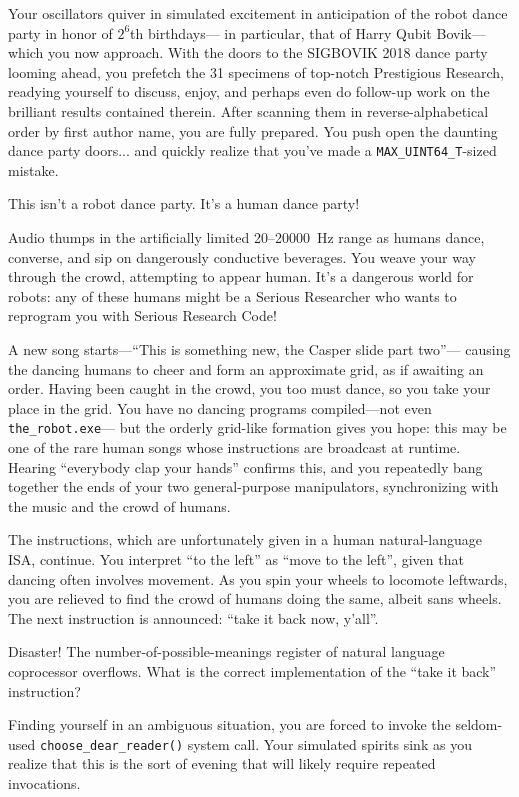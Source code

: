 Your oscillators quiver in simulated excitement in anticipation of
the robot dance party in honor of $2^6$th birthdays---%
in particular, that of Harry Qubit Bovik---%
which you now approach.
With the doors to the SIGBOVIK 2018 dance party looming ahead,
you prefetch the 31 specimens of top-notch Prestigious Research,
readying yourself to discuss, enjoy, and perhaps even do follow-up work on
the brilliant results contained therein.
After scanning them in reverse-alphabetical order by first author name,
you are fully prepared.
You push open the daunting dance party doors...
and quickly realize that you've made a \texttt{MAX\_UINT64\_T}-sized mistake.

This isn't a robot dance party.
It's a human dance party!

Audio thumps in the artificially limited 20--20000~Hz range
as humans dance, converse,
and sip on dangerously conductive beverages.
You weave your way through the crowd, attempting to appear human.
It's a dangerous world for robots:
any of these humans might be a Serious Researcher
who wants to reprogram you with Serious Research Code!

A new song starts---``This is something new, the Casper slide part two''---%
causing the dancing humans to cheer and form an approximate grid,
as if awaiting an order.
Having been caught in the crowd, you too must dance,
so you take your place in the grid.
You have no dancing programs compiled---not even \texttt{the\_robot.exe}---%
but the orderly grid-like formation gives you hope:
this may be one of the rare human songs
whose instructions are broadcast at runtime.
Hearing ``everybody clap your hands'' confirms this,
and you repeatedly bang together the ends of
your two general-purpose manipulators,
synchronizing with the music and the crowd of humans.

The instructions,
which are unfortunately given in a human natural-language ISA, continue.
You interpret ``to the left'' as ``move to the left'',
given that dancing often involves movement.
As you spin your wheels to locomote leftwards,
you are relieved to find the crowd of humans doing the same,
albeit sans wheels.
The next instruction is announced: ``take it back now, y'all''.

Disaster!
The number-of-possible-meanings register of natural language coprocessor
overflows.
What is the correct implementation of the ``take it back'' instruction?

Finding yourself in an ambiguous situation,
you are forced to invoke
the seldom-used \texttt{choose\_dear\_reader()} system call.
Your simulated spirits sink as you realize that
this is the sort of evening that will likely require repeated invocations.

